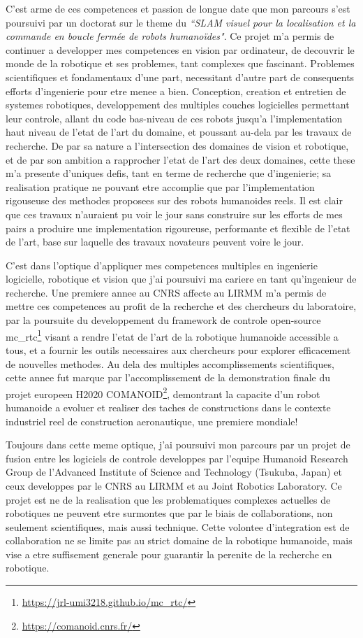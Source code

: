 \documentclass[11pt, a4paper]{awesome-cv}
\begin{document}
\begin{cvletter}
  C'est arme de ces competences et passion de longue date que mon parcours s'est poursuivi par un doctorat sur le theme du \emph{``SLAM visuel pour la localisation et la commande en boucle fermée de robots humanoïdes"}. Ce projet m'a permis de continuer a developper mes competences en vision par ordinateur, de decouvrir le monde de la robotique et ses problemes, tant complexes que fascinant. Problemes scientifiques et fondamentaux d'une part, necessitant d'autre part de consequents efforts d'ingenierie pour etre menee a bien. Conception, creation et entretien de systemes robotiques, developpement des multiples couches logicielles permettant leur controle, allant du code bas-niveau de ces robots jusqu'a l'implementation haut niveau de l'etat de l'art du domaine, et poussant au-dela par les travaux de recherche. De par sa nature a l'intersection des domaines de vision et robotique, et de par son ambition a rapprocher l'etat de l'art des deux domaines, cette these m'a presente d'uniques defis, tant en terme de recherche que d'ingenierie; sa realisation pratique ne pouvant etre accomplie que par l'implementation rigouseuse des methodes proposees sur des robots humanoides reels. Il est clair que ces travaux n'auraient pu voir le jour sans construire sur les efforts de mes pairs a produire une implementation rigoureuse, performante et flexible de l'etat de l'art, base sur laquelle des travaux novateurs peuvent voire le jour.

  C'est dans l'optique d'appliquer mes competences multiples en ingenierie logicielle, robotique et vision que j'ai poursuivi ma cariere en tant qu'ingenieur de recherche. Une premiere annee au CNRS affecte au LIRMM m'a permis de mettre ces competences au profit de la recherche et des chercheurs du laboratoire, par la poursuite du developpement du framework de controle open-source mc\_rtc\footnote{\url{https://jrl-umi3218.github.io/mc_rtc/}} visant a rendre l'etat de l'art de la robotique humanoide accessible a tous, et a fournir les outils necessaires aux chercheurs pour explorer efficacement de nouvelles methodes. Au dela des multiples accomplissements scientifiques, cette annee fut marque par l'accomplissement de la demonstration finale du projet europeen H2020 COMANOID\footnote{\url{https://comanoid.cnrs.fr/}}, demontrant la capacite d'un robot humanoide a evoluer et realiser des taches de constructions dans le contexte industriel reel de construction aeronautique, une premiere mondiale!

  Toujours dans cette meme optique, j'ai poursuivi mon parcours par un projet de fusion entre les logiciels de controle developpes par l'equipe Humanoid Research Group de l'Advanced Institute of Science and Technology (Tsukuba, Japan) et ceux developpes par le CNRS au LIRMM et au Joint Robotics Laboratory. Ce projet est ne de la realisation que les problematiques complexes actuelles de robotiques ne peuvent etre surmontes que par le biais de collaborations, non seulement scientifiques, mais aussi technique. Cette volontee d'integration est de collaboration ne se limite pas au strict domaine de la robotique humanoide, mais vise a etre suffisement generale pour guarantir la perenite de la recherche en robotique.


\end{cvletter}
\end{document}

